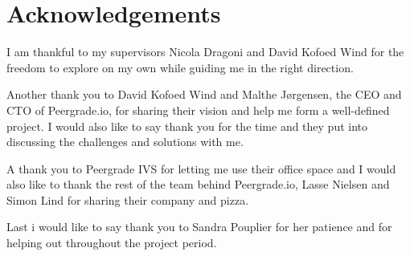 \chapter{Acknowledgements}

I am thankful to my supervisors Nicola Dragoni and David Kofoed Wind for the freedom to explore on my own while guiding me in the right direction.

Another thank you to David Kofoed Wind and Malthe Jørgensen, the CEO and CTO of Peergrade.io, for sharing their vision and help me form a well-defined project. I would also like to say thank you for the time and they put into discussing the challenges and solutions with me.

A thank you to Peergrade IVS for letting me use their office space and I would also like to thank the rest of the team behind Peergrade.io, Lasse Nielsen and Simon Lind for sharing their company and pizza.

Last i would like to say thank you to Sandra Pouplier for her patience and for helping out throughout the project period.
